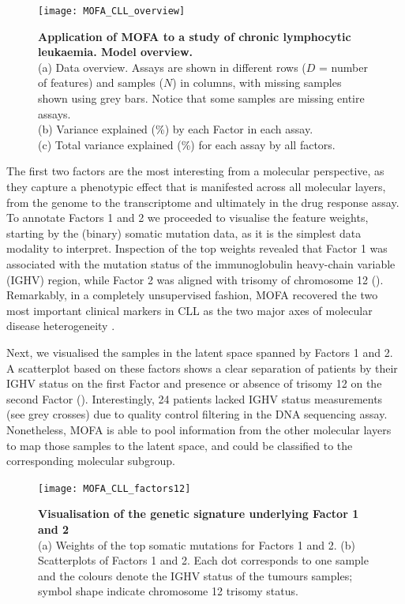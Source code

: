 \begin{figure}[H]
	\centering 	
	\texttt{[image: MOFA\_CLL\_overview]}
	\caption{\textbf{Application of MOFA to a study of chronic lymphocytic leukaemia. Model overview.}\\
	(a) Data overview. Assays are shown in different rows ($D$ = number of features) and samples ($N$) in columns, with missing samples shown using grey bars. Notice that some samples are missing entire assays.\\
	(b) Variance explained (\%) by each Factor in each assay.\\
	(c) Total variance explained (\%) for each assay by all factors.
	}
	\label{fig:MOFA_CLL_overview}
\end{figure}

The first two factors are the most interesting from a molecular perspective, as they capture a phenotypic effect that is manifested across all molecular layers, from the genome to the transcriptome and ultimately in the drug response assay.\\
To annotate Factors 1 and 2 we proceeded to visualise the feature weights, starting by the (binary) somatic mutation data, as it is the simplest data modality to interpret. Inspection of the top weights revealed that Factor 1 was associated with the mutation status of the immunoglobulin heavy-chain variable (IGHV) region, while Factor 2 was aligned with trisomy of chromosome 12 ().\\
Remarkably, in a completely unsupervised fashion, MOFA recovered the two most important clinical markers in CLL as the two major axes of molecular disease heterogeneity \cite{Fabbri2016,Bulian2017,Crombie2017}.

Next, we visualised the samples in the latent space spanned by Factors 1 and 2. A scatterplot based on these factors shows a clear separation of patients by their IGHV status on the first Factor and presence or absence of trisomy 12 on the second Factor (). Interestingly, 24 patients lacked IGHV status measurements (see grey crosses) due to quality control filtering in the DNA sequencing assay. Nonetheless, MOFA is able to pool information from the other molecular layers to map those samples to the latent space, and could be classified to the corresponding molecular subgroup.

\begin{figure}[H]
	\centering 	
	\texttt{[image: MOFA\_CLL\_factors12]}
	\caption{\textbf{Visualisation of the genetic signature underlying Factor 1 and 2}\\
	(a) Weights of the top somatic mutations for Factors 1 and 2.
	(b) Scatterplots of Factors 1 and 2. Each dot corresponds to one sample and the colours denote the IGHV status of the tumours samples; symbol shape indicate chromosome 12 trisomy status.
	}
	\label{fig:MOFA_CLL_factors12}
\end{figure}

